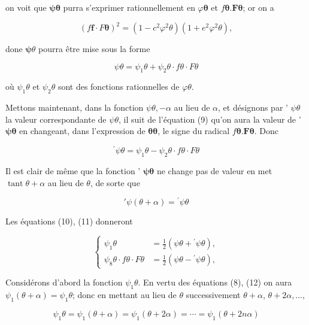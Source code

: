 \documentclass{article}
\begin{document}
on voit que \(\boldsymbol{\psi} \boldsymbol{\theta}\) purra s'exprimer rationnellement en \(\varphi \boldsymbol{\theta}\) et \(f \boldsymbol{\theta} . \boldsymbol{F} \boldsymbol{\theta}\); or on a

\[
(f \boldsymbol{f} \cdot F \boldsymbol{\theta})^{2}=\left(1-c^{2} \varphi^{2} \theta\right)\left(1+e^{2} \varphi^{2} \theta\right),
\]

done \(\boldsymbol{\psi} \theta\) pourra être mise sous la forme

\[
\psi \theta=\psi_{1} \theta+\psi_{2} \theta \cdot f \theta \cdot F \theta
\]

où \(\psi_{1} \theta\) et \(\psi_{2} \theta\) sont des fonctions rationnelles de \(\varphi \theta\).

Mettons maintenant, dans la fonction \(\psi \theta,-\alpha\) au lieu de \(\alpha\), et désignons par ' \(\psi \theta\) la valeur correspondante de \(\psi \theta\), il suit de l'équation (9) qu'on aura la valeur de ' \(\boldsymbol{\psi} \boldsymbol{\theta}\) en changeant, dans l'expression de \(\boldsymbol{\theta} \boldsymbol{\theta}\), le signe du radical \(f \boldsymbol{\theta} . \boldsymbol{F} \boldsymbol{\theta}\). Donc

\[
{ }^{\prime} \psi \theta=\psi_{1} \theta-\psi_{2} \theta \cdot f \theta \cdot F \theta
\]

Il est clair de même que la fonction ' \(\boldsymbol{\psi} \boldsymbol{\theta}\) ne change pas de valeur en met\(\operatorname{tant} \theta+\alpha\) au lieu de \(\theta\), de sorte que

\[
' \psi(\theta+\alpha)={ }^{\prime} \psi \theta
\]

Les équations (10), (11) donneront

\[
\left\{\begin{aligned}
\psi_{1} \theta & =\frac{1}{2}\left(\psi \theta+{ }^{\prime} \psi \theta\right), \\
\psi_{8} \theta \cdot f \theta \cdot F \theta & =\frac{1}{2}\left(\psi \theta-{ }^{\prime} \psi \theta\right),
\end{aligned}\right.
\]

Considérons d'abord la fonction \(\psi_{1} \theta\). En vertu des équations (8), (12) on aura \(\psi_{1}(\theta+\alpha)=\psi_{1} \theta\); donc en mettant au lieu de \(\theta\) successivement \(\theta+\alpha\), \(\theta+2 \alpha, \ldots\),

\[
\psi_{1} \theta=\psi_{1}(\theta+\alpha)=\psi_{1}(\theta+2 \alpha)=\cdots=\psi_{1}(\theta+2 n \alpha)
\]
\end{document}
